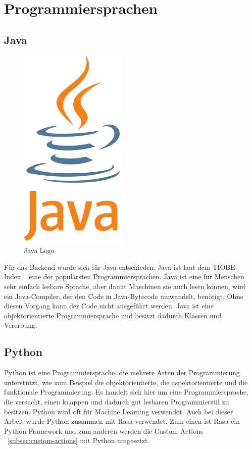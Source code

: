 \section{Programmiersprachen}

\subsection{Java}

\begin{figure}[hbt!]
    \centering
    \includegraphics[scale=0.5]{pics/java}
    \caption{Java Logo\cite{java}}
    \label{fig:impl:java}
\end{figure}

Für das Backend wurde sich für Java entschieden.
Java ist laut dem TIOBE-Index ~\cite{tiobe} eine der populärsten Programmiersprachen.
Java ist eine für Menschen sehr einfach lesbare Sprache, aber damit Maschinen sie auch lesen können, wird ein Java-Compiler, der den Code in Java-Bytecode umwandelt, benötigt.
Ohne diesen Vorgang kann der Code nicht ausgeführt werden.
Java ist eine objektorientierte Programmiersprache und besitzt dadurch Klassen und Vererbung\cite{java}.

\subsection{Python}

Python ist eine Programmiersprache, die mehrere Arten der Programmierung unterstützt, wie zum Beispiel die objektorientierte, die aspektorientierte und die funktionale Programmierung.
Es handelt sich hier um eine Programmiersprache, die versucht, einen knappen und dadurch gut lesbaren Programmierstil zu besitzen.
Python wird oft für Machine Learning verwendet.
Auch bei dieser Arbeit wurde Python zusammen mit Rasa verwendet.
Zum einen ist Rasa ein Python-Framework und zum anderen werden die Custom Actions ~\ref{subsec:custom-actions} mit Python umgesetzt.


